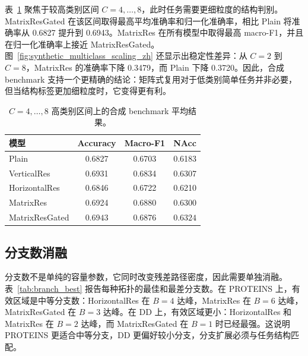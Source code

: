 \documentclass[UTF8,10pt]{ctexart}
\begin{document}
表~\ref{tab:synthetic_high_class_zh} 聚焦于较高类别区间 \(C=4,\ldots,8\)，此时任务需要更细粒度的结构判别。MatrixResGated 在该区间取得最高平均准确率和归一化准确率，相比 Plain 将准确率从 0.6827 提升到 0.6943。MatrixRes 在所有模型中取得最高 macro-F1，并且在归一化准确率上接近 MatrixResGated。图~\ref{fig:synthetic_multiclass_scaling_zh} 还显示出稳定性差异：从 \(C=2\) 到 \(C=8\)，MatrixRes 的准确率下降 0.3479，而 Plain 下降 0.3720。因此，合成 benchmark 支持一个更精确的结论：矩阵式复用对于低类别简单任务并非必要，但当结构标签更加细粒度时，它变得更有利。

\begin{table}[h]
\centering
\small
\caption{\(C=4,\ldots,8\) 高类别区间上的合成 benchmark 平均结果。}
\label{tab:synthetic_high_class_zh}
\begin{tabular}{l c c c}
\toprule
模型 & Accuracy & Macro-F1 & NAcc \\
\midrule
Plain & 0.6827 & 0.6703 & 0.6183 \\
VerticalRes & 0.6931 & 0.6834 & 0.6307 \\
HorizontalRes & 0.6846 & 0.6722 & 0.6210 \\
MatrixRes & 0.6924 & \(\mathbf{0.6880}\) & 0.6300 \\
MatrixResGated & \(\mathbf{0.6943}\) & 0.6876 & \(\mathbf{0.6324}\) \\
\bottomrule
\end{tabular}
\end{table}

\subsection{分支数消融}

分支数不是单纯的容量参数，它同时改变残差路径密度，因此需要单独消融。表~\ref{tab:branch_best} 报告每种拓扑的最佳和最差分支数。在 PROTEINS 上，有效区域是中等分支数：HorizontalRes 在 \(B=4\) 达峰，MatrixRes 在 \(B=6\) 达峰，MatrixResGated 在 \(B=3\) 达峰。在 DD 上，有效区域更小：HorizontalRes 和 MatrixRes 在 \(B=2\) 达峰，而 MatrixResGated 在 \(B=1\) 时已经最强。这说明 PROTEINS 更适合中等分支，DD 更偏好较小分支，分支扩展必须与任务结构匹配。
\end{document}
